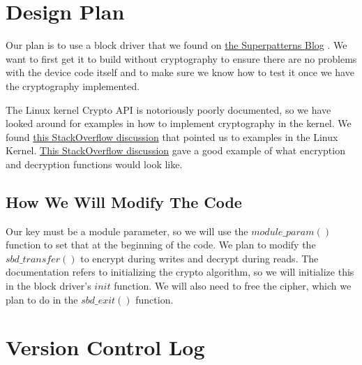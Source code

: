 \documentclass[letterpaper, onecolumn, draftclsnofoot, 10pt, compsoc]{IEEEtran}
\begin{document}
\section{Design Plan}
    \begin{singlespace}
    Our plan is to use a block driver that we found on  \href{http://blog.superpat.com/2010/05/04/a-simple-block-driver-for-linux-kernel-2-6-31/comment-page-2/#comment-148884}{the Superpatterns Blog} \cite{SuperPat}. We want to first get it to build without cryptography to ensure there are no problems with the device code itself and to make sure we know how to test it once we have the cryptography implemented.
    
    The Linux kernel Crypto API is notoriously poorly documented, so we have looked around for examples in how to implement cryptography in the kernel. We found \href{https://stackoverflow.com/questions/3869028/how-to-use-cryptoapi-in-the-linux-kernel-2-6}{this StackOverflow discussion} \cite{SOCryptoLinuxExample} that pointed us to examples in the Linux Kernel. \href{https://stackoverflow.com/questions/9218491/crypto-api-in-linux-kernel-for-aes-error}{This StackOverflow discussion} \cite{SOCryptoCodeExample} gave a good example of what encryption and decryption functions would look like.
    
    
    \subsection{How We Will Modify The Code}
    Our key must be a module parameter, so we will use the $module\_param()$ function to set that at the beginning of the code. We plan to modify the $sbd\_transfer()$ to encrypt during writes and decrypt during reads. The documentation refers to initializing the crypto algorithm, so we will initialize this in the block driver's $init$ function. We will also need to free the cipher, which we plan to do in the $sbd\_exit()$ function.
    
        
    \end{singlespace}
    
\section{Version Control Log}
    
    
\end{document}
